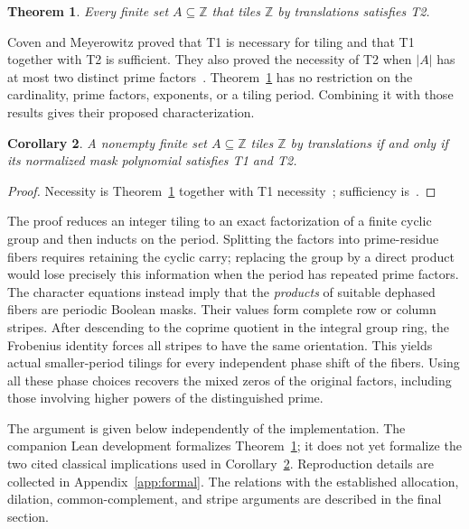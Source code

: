 \documentclass[11pt]{article}
\newtheorem{theorem}{Theorem}
\newtheorem{corollary}[theorem]{Corollary}
\newcommand{\Z}{\mathbb Z}
\begin{document}
\begin{theorem}\label{thm:integer}
Every finite set $A\subseteq\Z$ that tiles $\Z$ by translations satisfies T2.
\end{theorem}

Coven and Meyerowitz proved that T1 is necessary for tiling and that T1 together with T2 is sufficient. They also proved the necessity of T2 when $|A|$ has at most two distinct prime factors~\cite[Theorems A, B1, and B2]{CM}. Theorem~\ref{thm:integer} has no restriction on the cardinality, prime factors, exponents, or a tiling period. Combining it with those results gives their proposed characterization.

\begin{corollary}\label{cor:characterization}
A nonempty finite set $A\subseteq\Z$ tiles $\Z$ by translations if and only if its normalized mask polynomial satisfies T1 and T2.
\end{corollary}
\begin{proof}
Necessity is Theorem~\ref{thm:integer} together with T1 necessity~\cite[Theorem B1]{CM}; sufficiency is~\cite[Theorem A]{CM}.
\end{proof}

The proof reduces an integer tiling to an exact factorization of a finite cyclic group and then inducts on the period. Splitting the factors into prime-residue fibers requires retaining the cyclic carry; replacing the group by a direct product would lose precisely this information when the period has repeated prime factors. The character equations instead imply that the \emph{products} of suitable dephased fibers are periodic Boolean masks. Their values form complete row or column stripes. After descending to the coprime quotient in the integral group ring, the Frobenius identity forces all stripes to have the same orientation. This yields actual smaller-period tilings for every independent phase shift of the fibers. Using all these phase choices recovers the mixed zeros of the original factors, including those involving higher powers of the distinguished prime.

The argument is given below independently of the implementation. The companion Lean development formalizes Theorem~\ref{thm:integer}; it does not yet formalize the two cited classical implications used in Corollary~\ref{cor:characterization}. Reproduction details are collected in Appendix~\ref{app:formal}. The relations with the established allocation, dilation, common-complement, and stripe arguments are described in the final section.
\end{document}
